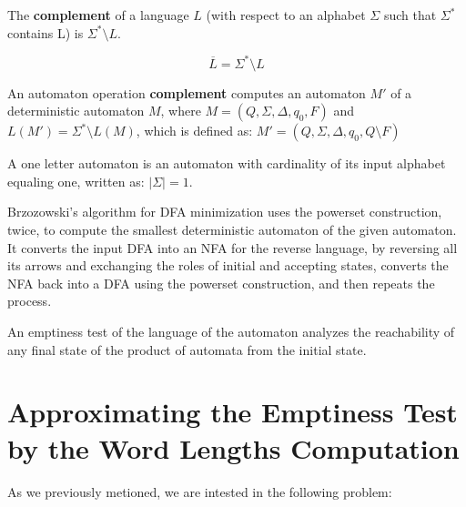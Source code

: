 \begin{mydef}
The \textbf{complement} of a language $L$ (with respect to an alphabet $\Sigma$ such that $\Sigma^\ast$ contains L) is $\Sigma^\ast \setminus L$.

\begin{equation*}
\overline{L} = \Sigma^\ast \setminus L
\end{equation*}
\end{mydef}

\begin{mydef}
An automaton operation \textbf{complement} computes an automaton $M'$ of a deterministic automaton $M$, where $M = (Q, \Sigma, \Delta, q_{0}, F)$ and $L(M') = \Sigma^\ast \setminus L(M)$, which is defined as:
$M' = (Q, \Sigma, \Delta, q_{0}, Q \setminus F)$

\end{mydef}

\begin{mydef}
A one letter automaton is an automaton with cardinality of its input alphabet equaling one, written as: $|\Sigma| = 1$.
\end{mydef}

\begin{mydef}
Brzozowski's algorithm for DFA minimization uses the powerset construction, twice, to compute the smallest deterministic automaton of the given automaton. It converts the input DFA into an NFA for the reverse language, by reversing all its arrows and exchanging the roles of initial and accepting states, converts the NFA back into a DFA using the powerset construction, and then repeats the process.
\end{mydef}


\begin{mydef}
An emptiness test of the language of the automaton analyzes the reachability of any final state of the product of automata from the initial state.
\end{mydef}


\chapter{Approximating the Emptiness Test by the Word Lengths Computation}

As we previously metioned, we are intested in the following problem:
\begin{equation*}
\end{equation*}

